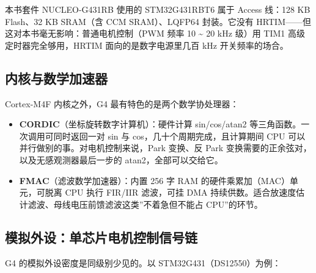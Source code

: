 \documentclass[
  UTF8,
  scheme=plain,
  fontsize=10pt,
  openany
]{ctexbook}
\begin{document}
本书套件 NUCLEO-G431RB 使用的 STM32G431RBT6 属于 Access 线：128 KB
Flash、32 KB SRAM（含 CCM SRAM）、LQFP64 封装。它没有
HRTIM------但这对本书毫无影响：普通电机控制（PWM 频率 10
\textasciitilde{} 20 kHz 级）用 TIM1 高级定时器完全够用，HRTIM
面向的是数字电源里几百 kHz 开关频率的场合。

\subsection{内核与数学加速器}\label{ux5185ux6838ux4e0eux6570ux5b66ux52a0ux901fux5668}

Cortex-M4F 内核之外，G4 最有特色的是两个数学协处理器：

\begin{itemize}
\tightlist
\item
  \textbf{CORDIC}（坐标旋转数字计算机）：硬件计算 sin/cos/atan2
  等三角函数。一次调用可同时返回一对 sin 与
  cos，几十个周期完成，且计算期间 CPU
  可以并行做别的事。对电机控制来说，Park 变换、反 Park
  变换需要的正余弦对，以及无感观测器最后一步的 atan2，全部可以交给它。
\item
  \textbf{FMAC}（滤波数学加速器）：内置 256 字 RAM
  的硬件乘累加（MAC）单元，可脱离 CPU 执行 FIR/IIR 滤波，可挂 DMA
  持续供数。适合放速度估计滤波、母线电压前馈滤波这类''不着急但不能占
  CPU''的环节。
\end{itemize}

\subsection{模拟外设：单芯片电机控制信号链}\label{ux6a21ux62dfux5916ux8bbeux5355ux82afux7247ux7535ux673aux63a7ux5236ux4fe1ux53f7ux94fe}

G4 的模拟外设密度是同级别少见的。以 STM32G431（DS12550）为例：
\end{document}
